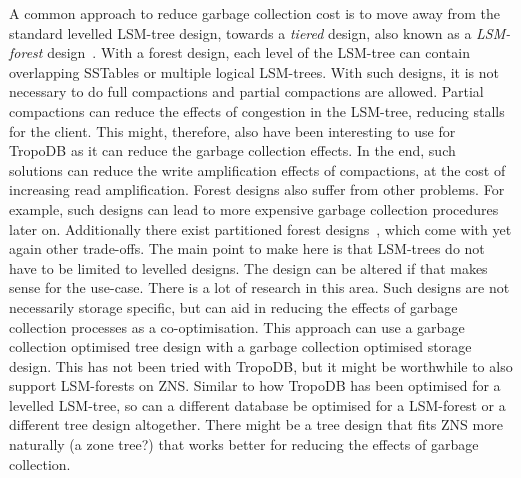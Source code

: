 A common approach to reduce garbage collection cost is to move away from the standard levelled LSM-tree design, towards a \textit{tiered} design, also known as a \textit{LSM-forest} design~\cite{liu2021ptierdb, mei2018sifrdb, raju2017pebblesdb}. With a forest design, each level of the LSM-tree can contain overlapping SSTables or multiple logical LSM-trees. With such designs, it is not necessary to do full compactions and partial compactions are allowed.  Partial compactions can reduce the effects of congestion in the LSM-tree, reducing stalls for the client. This might, therefore, also have been interesting to use for TropoDB as it can reduce the garbage collection effects. In the end, such solutions can reduce the write amplification effects of compactions, at the cost of increasing read amplification. Forest designs also suffer from other problems. For example, such designs can lead to more expensive garbage collection procedures later on. Additionally there exist partitioned forest designs~\cite{mei2018sifrdb}, which come with yet again other trade-offs. The main point to make here is that LSM-trees do not have to be limited to levelled designs. The design can be altered if that makes sense for the use-case. There is a lot of research in this area. Such designs are not necessarily storage specific, but can aid in reducing the effects of garbage collection processes as a co-optimisation. This approach can use a garbage collection optimised tree design with a garbage collection optimised storage design. This has not been tried with TropoDB, but it might be worthwhile to also support LSM-forests on ZNS. Similar to how TropoDB has been optimised for a levelled LSM-tree, so can a different database be optimised for a LSM-forest or a different tree design altogether. There might be a tree design that fits ZNS more naturally (a zone tree?) that works better for reducing the effects of garbage collection.

